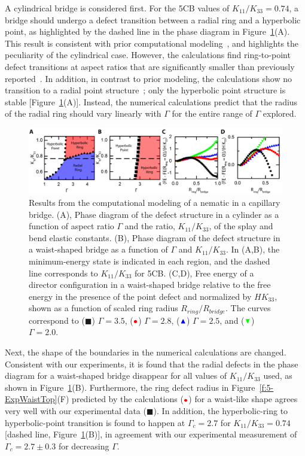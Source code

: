 A cylindrical bridge is considered first.
For the 5CB values of $K_{11}/K_{33} = 0.74$, a bridge should undergo a defect transition between a radial ring and a hyperbolic point, as highlighted by the dashed line in the phase diagram in Figure~\ref{f:5-Calcs}(A).
This result is consistent with prior computational modeling~\cite{RN144}, and highlights the peculiarity of the cylindrical case.
However, the calculations find ring-to-point defect transitions at aspect ratios that are significantly smaller than previously reported~\cite{RN144}.
In addition, in contrast to prior modeling, the calculations show no transition to a radial point structure~\cite{RN144}; only the hyperbolic point structure is stable [Figure~\ref{f:5-Calcs}(A)].
Instead, the numerical calculations predict that the radius of the radial ring should vary linearly with $\Gamma$ for the entire range of $\Gamma$ explored.
\begin{figure}
  \centering
  \includegraphics{figures/C5/Ch5-Figs_Calcs.png}
  \caption{Results from the computational modeling of a nematic in a capillary bridge.
  (A), Phase diagram of the defect structure in a cylinder as a function of aspect ratio $\Gamma$ and the ratio, $K_{11}/K_{33}$, of the splay and bend elastic constants.
  (B), Phase diagram of the defect structure in a waist-shaped bridge as a function of $\Gamma$ and $K_{11}/K_{33}$.
  In (A,B), the minimum-energy state is indicated in each region, and the dashed line corresponds to $K_{11} / K_{33}$ for 5CB.\@
  (C,D), Free energy of a director configuration in a waist-shaped bridge relative to the free energy in the presence of the point defect and normalized by $H K_{33}$, shown as a function of scaled ring radius $R_{ring}/R_{bridge}$.
  The curves correspond to (${\blacksquare}$) $\Gamma = 3.5$, (${\color{red} \bullet}$) $\Gamma = 2.8$, (${\color{blue} \blacktriangle}$) $\Gamma = 2.5$, and (${\color{green} \blacktriangledown}$) $\Gamma = 2.0$.}\label{f:5-Calcs}
\end{figure}

Next, the shape of the boundaries in the numerical calculations are changed.
Consistent with our experiments, it is found that the radial defects in the phase diagram for a waist-shaped bridge disappear for all values of $K_{11}/K_{33}$ used, as shown in Figure~\ref{f:5-Calcs}(B).
Furthermore, the ring defect radius in Figure~\ref{f:5-ExpWaistTop}(F) predicted by the calculations (${\color{red} \bullet}$) for a waist-like shape agrees very well with our experimental data ($\blacksquare$).
In addition, the hyperbolic-ring to hyperbolic-point transition is found to happen at $\Gamma_c = 2.7$ for $K_{11}/K_{33} = 0.74$ [dashed line, Figure~\ref{f:5-Calcs}(B)], in agreement with our experimental measurement of $\Gamma_c = 2.7 \pm 0.3$ for decreasing $\Gamma$.

